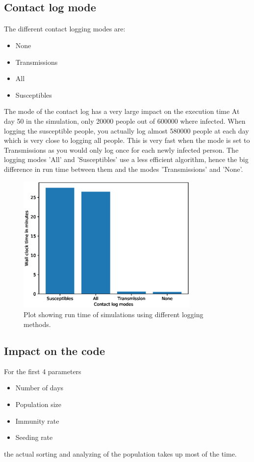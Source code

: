 \documentclass[runningheads]{llncs}
\begin{document}
\subsection{Contact log mode}

\paragraph{} The different contact logging modes are:
\begin{itemize}
	\item None
	\item Transmissions
	\item All
	\item Susceptibles
\end{itemize}

The mode of the contact log has a very large impact on the execution time
At day 50 in the simulation, only 20000 people out of 600000 where infected. When logging the susceptible people, you actually log almost 580000 people at each day which is very close to logging all people. This is very fast when the mode is set to Transmissions as you would only log once for each newly infected person. The logging modes 'All' and 'Susceptibles' use a less efficient algorithm, hence the big difference in run time between them and the modes 'Transmissions' and 'None'.

\begin{figure}[h!]
\centering
	\includegraphics[width=0.8\textwidth]{3_Performance_Profiling/3_contactlogmode.eps}
	\caption{Plot showing run time of simulations using different logging methods.} 
	\label{Gprof_contactlogmode}
\end{figure}

\subsection{Impact on the code}
For the first 4 parameters
\begin{itemize}
	\item Number of days
	\item Population size
	\item Immunity rate
	\item Seeding rate
\end{itemize}
the actual sorting and analyzing of the population takes up most of the time.
\end{document}
